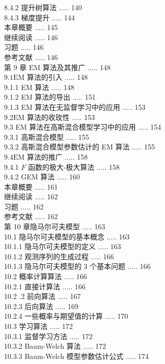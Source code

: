 \documentclass[10pt]{article}
\begin{document}
\begin{CJK*}{UTF8}{bsmi}
8.4.2 提升树算法 ..... 140\\
8.4.3 梯度提升 ..... 144\\
本章概要 ..... 145\\
继续阅读 ..... 146\\
习题 ..... 146\\
参考文献 ..... 146\\
第 9 章 $\mathrm{EM}$ 算法及其推广 ..... 148\\
$9.1 \mathrm{EM}$ 算法的引入 ..... 148\\
9.1.1 EM 算法 ..... 148\\
9.1.2 EM 算法的导出 ..... 151\\
9.1.3 EM 算法在无监督学习中的应用 ..... 153\\
$9.2 \mathrm{EM}$ 算法的收玫性 ..... 153\\
9.3 EM 算法在高斯混合模型学习中的应用 ..... 154\\
9.3.1 高斯混合模型 ..... 155\\
9.3.2 高斯混合模型参数估计的 EM 算法 ..... 155\\
$9.4 \mathrm{EM}$ 算法的推广 ..... 158\\
9.4.1 $F$ 函数的极大-极大算法 ..... 158\\
9.4.2 GEM 算法 ..... 160\\
本章概要 ..... 161\\
继续阅读 ..... 162\\
习题 ..... 162\\
参考文献 ..... 162\\
第 10 章隐马尔可夫模型 ..... 163\\
10.1 隐马尔可夫模型的基本概念 ..... 163\\
10.1.1 隐马尔可夫模型的定义 ..... 163\\
10.1.2 观测序列的生成过程 ..... 166\\
10.1.3 隐马尔可夫模型的 3 个基本问题 ..... 166\\
10.2 概率计算算法 ..... 166\\
10.2.1 直接计算法 ..... 166\\
10.2 .2 前向算法 ..... 167\\
10.2.3 后向算法 ..... 169\\
10.2.4 一些概率与期望值的计算 ..... 170\\
10.3 学习算法 ..... 172\\
10.3.1 监督学习方法 ..... 172\\
10.3.2 Baum-Welch 算法 ..... 172\\
10.3.3 Baum-Welch 模型参数估计公式 ..... 174\\

\end{CJK*}
\end{document}
